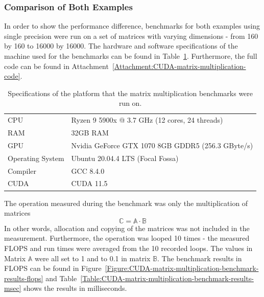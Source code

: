 \subsubsection{Comparison of Both Examples}\label{Subsubsection:matrix-multiplication-comparison-of-examples}
In order to show the performance difference, benchmarks for both examples using single precision were run on a set of matrices with varying dimensions - from 160 by 160 to 16000 by 16000. The hardware and software specifications of the machine used for the benchmarks can be found in Table~\ref{Table:CUDA-matrix-multiplication-benchmark-system}. Furthermore, the full code can be found in Attachment~\ref{Attachment:CUDA-matrix-multiplication-code}.

\begin{table}[h]
	\centering
	\begin{tabular}{|l|l|}
		\hline
		CPU              & Ryzen 9 5900x @ 3.7 GHz (12 cores, 24 threads) \\
		RAM              & 32GB RAM \\
		GPU              & Nvidia GeForce GTX 1070 8GB GDDR5 (256.3 GByte/s)\\
		Operating System & Ubuntu 20.04.4 LTS (Focal Fossa) \\
		Compiler         & GCC 8.4.0 \\
		CUDA             & CUDA 11.5 \\ \hline
	\end{tabular}
	\caption{Specifications of the platform that the matrix multiplication benchmarks were run on.}
	\label{Table:CUDA-matrix-multiplication-benchmark-system}
\end{table}

The operation measured during the benchmark was only the multiplication of matrices
$$ \mathbb{C} = \mathbb{A} \cdot \mathbb{B} $$
In other words, allocation and copying of the matrices was not included in the measurement. Furthermore, the operation was looped 10 times - the measured FLOPS and run times were averaged from the 10 recorded loops. The values in Matrix $ \mathbb{A} $ were all set to 1 and to 0.1 in matrix $ \mathbb{B} $. The benchmark results in FLOPS can be found in Figure~\ref{Figure:CUDA-matrix-multiplication-benchmark-results-flops} and Table~\ref{Table:CUDA-matrix-multiplication-benchmark-results-msec} shows the results in milliseconds.

